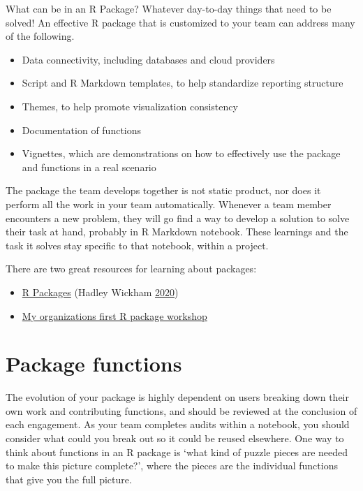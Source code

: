 \documentclass[
]{book}
\providecommand{\tightlist}{%
  \setlength{\itemsep}{0pt}\setlength{\parskip}{0pt}}
\begin{document}
What can be in an R Package? Whatever day-to-day things that need to be solved! An effective R package that is customized to your team can address many of the following.

\begin{itemize}
\tightlist
\item
  Data connectivity, including databases and cloud providers
\item
  Script and R Markdown templates, to help standardize reporting structure
\item
  Themes, to help promote visualization consistency
\item
  Documentation of functions
\item
  Vignettes, which are demonstrations on how to effectively use the package and functions in a real scenario
\end{itemize}

The package the team develops together is not static product, nor does it perform all the work in your team automatically. Whenever a team member encounters a new problem, they will go find a way to develop a solution to solve their task at hand, probably in R Markdown notebook. These learnings and the task it solves stay specific to that notebook, within a project.

There are two great resources for learning about packages:

\begin{itemize}
\tightlist
\item
  \href{https://r-pkgs.org}{R Packages} (Hadley Wickham \protect\hyperlink{ref-r-pkgs}{2020})
\item
  \href{https://my-org-first-pkg-2020.netlify.app}{My organizations first R package workshop}
\end{itemize}

\hypertarget{package-functions}{%
\section{Package functions}\label{package-functions}}

The evolution of your package is highly dependent on users breaking down their own work and contributing functions, and should be reviewed at the conclusion of each engagement. As your team completes audits within a notebook, you should consider what could you break out so it could be reused elsewhere. One way to think about functions in an R package is `what kind of puzzle pieces are needed to make this picture complete?', where the pieces are the individual functions that give you the full picture.
\end{document}
